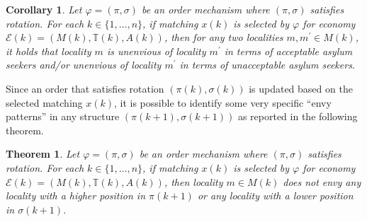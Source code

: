 \documentclass[12pt,fleqn]{article}
\newtheorem{theorem}{Theorem}
\newtheorem{corollary}{Corollary}
\begin{document}
\begin{corollary}\rm\label{COROLLARY:envy}
Let $\varphi=(\pi,\sigma)$ be an order mechanism where $(\pi,\sigma)$ satisfies rotation.
For each $k\in \{1,\ldots,n\}$, if matching $x(k)$ is selected by $\varphi$ for economy $\mathcal{E}(k)=(M(k),\mathbb{T}(k),A(k))$, then for any two localities $m,m^\prime\in M(k)$, it holds that locality $m$ is unenvious of locality $m^\prime$ in terms of acceptable asylum seekers and/or unenvious of locality $m^\prime$ in terms of unacceptable asylum seekers.
\end{corollary}
\noindent Since an order that satisfies rotation $(\pi(k),\sigma(k))$ is updated based on the selected matching $x(k)$, it is possible to identify some very specific ``envy patterns'' in any structure $(\pi(k+1),\sigma(k+1))$ as reported in the following theorem.
\begin{theorem}\rm\label{TH:structures}
Let $\varphi=(\pi,\sigma)$ be an order mechanism where $(\pi,\sigma)$ satisfies rotation.
For each $k\in \{1,\ldots,n\}$, if matching $x(k)$ is selected by $\varphi$ for economy $\mathcal{E}(k)=(M(k),\mathbb{T}(k),A(k))$, then locality $m\in M(k)$ does not envy any
locality with a higher position in $\pi(k+1)$ or any locality with a lower position in $\sigma(k+1)$.
\end{theorem}
\end{document}
